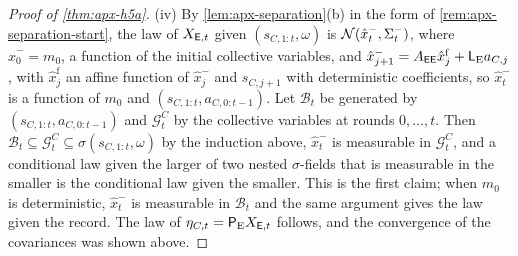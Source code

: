 \begin{proof}[Proof of \cref{thm:apx-h5a}]
(iv) By \cref{lem:apx-separation}(b) in the form of \cref{rem:apx-separation-start}, the law of $X_{\mathsf{E},t}$ given $(s_{C,1:t},\omega)$ is $\mathcal{N}(\hat x^-_t,\Sigma^-_t)$, where $\hat x^-_0=m_0$, a function of the initial collective variables, and $\hat x^-_{j+1}=A_{\mathsf{E}\mathsf{E}}\hat x^{\mathrm f}_j+\mathsf L_{\mathrm E}a_{C,j}$, with $\hat x^{\mathrm f}_j$ an affine function of $\hat x^-_j$ and $s_{C,j+1}$ with deterministic coefficients, so $\hat x^-_t$ is a function of $m_0$ and $(s_{C,1:t},a_{C,0:t-1})$. Let $\mathcal B_t$ be generated by $(s_{C,1:t},a_{C,0:t-1})$ and $\mathcal G^C_t$ by the collective variables at rounds $0,\dots,t$. Then $\mathcal B_t\subseteq\mathcal G^C_t\subseteq\sigma(s_{C,1:t},\omega)$ by the induction above, $\hat x^-_t$ is measurable in $\mathcal G^C_t$, and a conditional law given the larger of two nested $\sigma$-fields that is measurable in the smaller is the conditional law given the smaller. This is the first claim; when $m_0$ is deterministic, $\hat x^-_t$ is measurable in $\mathcal B_t$ and the same argument gives the law given the record. The law of $\eta_{C,t}=\mathsf P_{\mathrm E}X_{\mathsf{E},t}$ follows, and the convergence of the covariances was shown above.


\end{proof}
